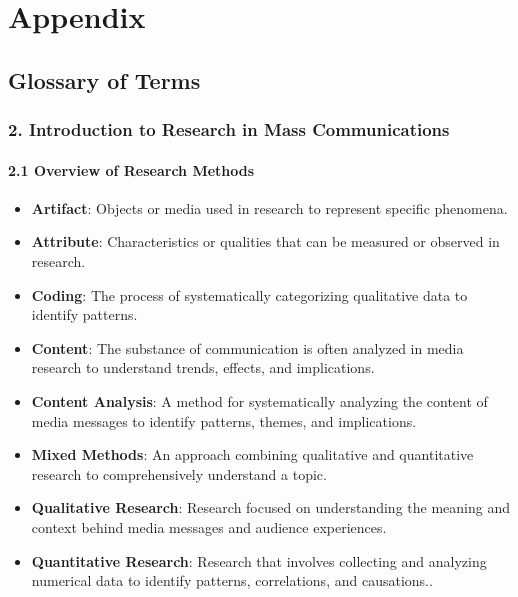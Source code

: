 \documentclass[
]{book}
\providecommand{\tightlist}{%
  \setlength{\itemsep}{0pt}\setlength{\parskip}{0pt}}
\begin{document}
\chapter{Appendix}\label{appendix-1}

\section{Glossary of Terms}\label{glossary-of-terms}

\subsection*{\texorpdfstring{2. \textbf{Introduction to Research in Mass Communications}}{2. Introduction to Research in Mass Communications}}\label{introduction-to-research-in-mass-communications}

\subsubsection*{\texorpdfstring{\textbf{2.1 Overview of Research Methods}}{2.1 Overview of Research Methods}}\label{overview-of-research-methods}

\begin{itemize}
\tightlist
\item
  \textbf{Artifact}: Objects or media used in research to represent specific phenomena.
\item
  \textbf{Attribute}: Characteristics or qualities that can be measured or observed in research.
\item
  \textbf{Coding}: The process of systematically categorizing qualitative data to identify patterns.
\item
  \textbf{Content}: The substance of communication is often analyzed in media research to understand trends, effects, and implications.
\item
  \textbf{Content Analysis}: A method for systematically analyzing the content of media messages to identify patterns, themes, and implications.
\item
  \textbf{Mixed Methods}: An approach combining qualitative and quantitative research to comprehensively understand a topic.
\item
  \textbf{Qualitative Research}: Research focused on understanding the meaning and context behind media messages and audience experiences.
\item
  \textbf{Quantitative Research}: Research that involves collecting and analyzing numerical data to identify patterns, correlations, and causations..
\end{itemize}
\end{document}
